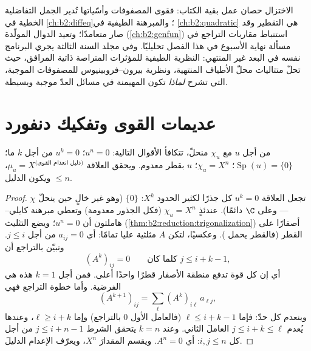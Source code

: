 \begin{remark}
الاختزال حصان عمل بقية الكتاب: فقوى المصفوفات
وأسّياتها تُدير الجمل التفاضلية الخطية في
\cref{ch:b2:diffeq}؛ والمبرهنة الطيفية في \cref{ch:b2:quadratic}
هي التقطير وقد صار متعامدًا؛ وتعيد الدوال المولّدة
(\cref{ch:b2:genfun}) استنباط مقاربات التراجع في مسألة نهاية
الأسبوع في هذا الفصل تحليليًا. وفي مجلد السنة الثالثة يجري
البرنامج نفسه في البعد غير المنتهي: النظرية الطيفية للمؤثرات
المتراصة ذاتية المرافق، حيث تحلّ متتاليات  محلّ
الأطياف المنتهية، ونظرية بيرون--فروبينيوس للمصفوفات الموجبة،
التي تشرح \emph{لماذا} تكون  المهيمنة في مسائل
العدّ موجبة وبسيطة.
\end{remark}

\section{عديمات القوى وتفكيك دنفورد}

\begin{proposition}\label{prop:b2:reduction:nilpotent}
من أجل $u$ مع $\chi_u$ منحلّ، تتكافأ الأقوال التالية: $u^n =
0$؛ $u^k = 0$ من أجل $k$ ما؛ $\operatorname{Sp}(u) = \{0\}$؛ $\chi_u
= X^n$؛ $u$  بقطر معدوم. ويحقق  العلاقة $\mu_u = X^{\text{(دليل انعدام القوى)}}$، ويكون الدليل
$\leq n$.
\end{proposition}

\begin{proof}
تجعل العلاقة $u^k = 0$ كل  جذرًا لكثير الحدود $X^k$:  $\{0\}$
(وهو غير خالٍ حين ينحلّ $\chi$ --- وعلى $\C$ دائمًا). عندئذٍ $\chi_u =
X^n$ (فكل الجذور معدومة) وتعطي مبرهنة كايلي--هاملتون أن $u^n = 0$؛
ويضع التثليث (\cref{thm:b2:reduction:trigonalization})
أصفارًا على القطر (فالقطر يحمل ).
وعكسيًا، لتكن $A$ مثلثية عليا تمامًا: أي $a_{ij} = 0$
من أجل $j \leq i$. ونبيّن بالتراجع أن
\[
(A^k)_{ij} = 0 \qquad \text{كلما كان } j \leq i + k - 1,
\]
أي إن كل قوة تدفع منطقة الأصفار قطرًا واحدًا أعلى. فمن أجل
$k = 1$ هذه هي الفرضية. وأما خطوة التراجع فهي
\[
(A^{k+1})_{ij} = \sum_{\ell} (A^k)_{i\ell}\,a_{\ell j} ,
\]
وينعدم كل حدّ: فإما $\ell \leq i + k - 1$ (فالعامل الأول
$0$ بالتراجع) وإما $\ell \geq i + k$، وعندها
يُعدم $j \leq i + k \leq \ell$ العاملَ الثاني. وعند $k = n$ يتحقق
الشرط $j \leq i + n - 1$ من أجل كل $i, j \leq n$: أي $A^n =
0$. ويقسم  المقدارَ $X^n$، ويعرّف الإعدام
الدليلَ.
\end{proof}

